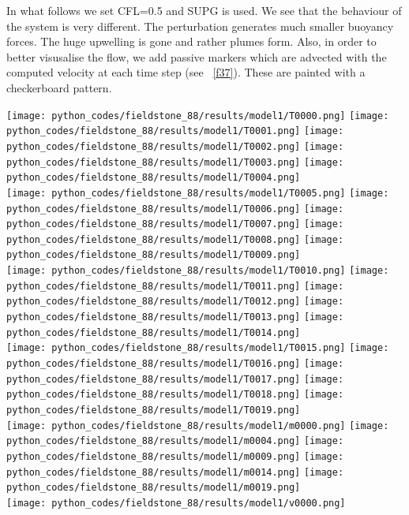 In what follows we set CFL=0.5 and SUPG is used.
We see that the behaviour of the system is very different. The perturbation generates 
much smaller buoyancy forces. The huge upwelling is gone and rather plumes form. 
Also, in order to better visusalise the flow, we add passive markers which are 
advected with the computed velocity at each time step (see \stone~\ref{f37}).
These are painted with a checkerboard pattern.

\newpage

\begin{center}
\texttt{[image: python\_codes/fieldstone\_88/results/model1/T0000.png]}
\texttt{[image: python\_codes/fieldstone\_88/results/model1/T0001.png]}
\texttt{[image: python\_codes/fieldstone\_88/results/model1/T0002.png]}
\texttt{[image: python\_codes/fieldstone\_88/results/model1/T0003.png]}
\texttt{[image: python\_codes/fieldstone\_88/results/model1/T0004.png]}\\
\texttt{[image: python\_codes/fieldstone\_88/results/model1/T0005.png]}
\texttt{[image: python\_codes/fieldstone\_88/results/model1/T0006.png]}
\texttt{[image: python\_codes/fieldstone\_88/results/model1/T0007.png]}
\texttt{[image: python\_codes/fieldstone\_88/results/model1/T0008.png]}
\texttt{[image: python\_codes/fieldstone\_88/results/model1/T0009.png]}\\
\texttt{[image: python\_codes/fieldstone\_88/results/model1/T0010.png]}
\texttt{[image: python\_codes/fieldstone\_88/results/model1/T0011.png]}
\texttt{[image: python\_codes/fieldstone\_88/results/model1/T0012.png]}
\texttt{[image: python\_codes/fieldstone\_88/results/model1/T0013.png]}
\texttt{[image: python\_codes/fieldstone\_88/results/model1/T0014.png]}\\
\texttt{[image: python\_codes/fieldstone\_88/results/model1/T0015.png]}
\texttt{[image: python\_codes/fieldstone\_88/results/model1/T0016.png]}
\texttt{[image: python\_codes/fieldstone\_88/results/model1/T0017.png]}
\texttt{[image: python\_codes/fieldstone\_88/results/model1/T0018.png]}
\texttt{[image: python\_codes/fieldstone\_88/results/model1/T0019.png]}\\
\texttt{[image: python\_codes/fieldstone\_88/results/model1/m0000.png]}
\texttt{[image: python\_codes/fieldstone\_88/results/model1/m0004.png]}
\texttt{[image: python\_codes/fieldstone\_88/results/model1/m0009.png]}
\texttt{[image: python\_codes/fieldstone\_88/results/model1/m0014.png]}
\texttt{[image: python\_codes/fieldstone\_88/results/model1/m0019.png]}\\
\texttt{[image: python\_codes/fieldstone\_88/results/model1/v0000.png]}

\end{center}
